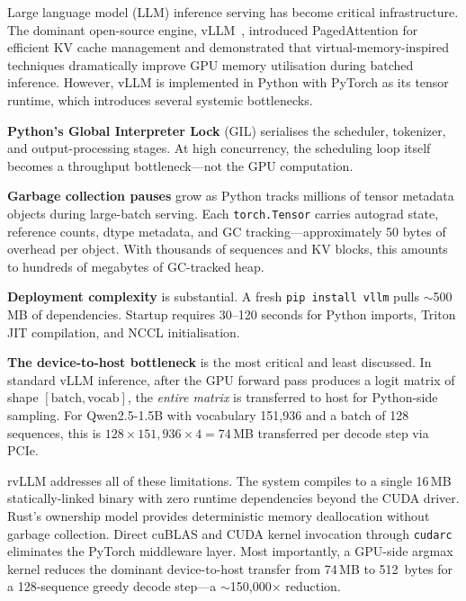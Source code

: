 \documentclass[11pt,a4paper]{article}
\begin{document}
Large language model (LLM) inference serving has become critical infrastructure.
The dominant open-source engine, vLLM~\cite{kwon2023vllm}, introduced PagedAttention
for efficient KV cache management and demonstrated that virtual-memory-inspired
techniques dramatically improve GPU memory utilisation during batched inference.
However, vLLM is implemented in Python with PyTorch as its tensor runtime, which
introduces several systemic bottlenecks.

\textbf{Python's Global Interpreter Lock} (GIL) serialises the scheduler, tokenizer,
and output-processing stages. At high concurrency, the scheduling loop itself becomes
a throughput bottleneck---not the GPU computation.

\textbf{Garbage collection pauses} grow as Python tracks millions of tensor metadata
objects during large-batch serving. Each \texttt{torch.Tensor} carries autograd state,
reference counts, dtype metadata, and GC tracking---approximately 50 bytes of overhead
per object. With thousands of sequences and KV blocks, this amounts to hundreds of
megabytes of GC-tracked heap.

\textbf{Deployment complexity} is substantial. A fresh \texttt{pip install vllm}
pulls $\sim$500\,MB of dependencies. Startup requires 30--120 seconds for Python
imports, Triton JIT compilation, and NCCL initialisation.

\textbf{The device-to-host bottleneck} is the most critical and least discussed.
In standard vLLM inference, after the GPU forward pass produces a logit matrix of
shape $[\text{batch}, \text{vocab}]$, the \emph{entire matrix} is transferred to
host for Python-side sampling. For Qwen2.5-1.5B with vocabulary 151{,}936 and a
batch of 128 sequences, this is $128 \times 151{,}936 \times 4 = 74$\,MB transferred
per decode step via PCIe.

rvLLM addresses all of these limitations. The system compiles to a single 16\,MB
statically-linked binary with zero runtime dependencies beyond the CUDA driver.
Rust's ownership model provides deterministic memory deallocation without garbage
collection. Direct cuBLAS and CUDA kernel invocation through
\texttt{cudarc}~\cite{cudarc2023} eliminates the PyTorch middleware layer. Most
importantly, a GPU-side argmax kernel reduces the dominant device-to-host transfer
from 74\,MB to 512~bytes for a 128-sequence greedy decode step---a
$\sim$150{,}000$\times$ reduction.
\end{document}
